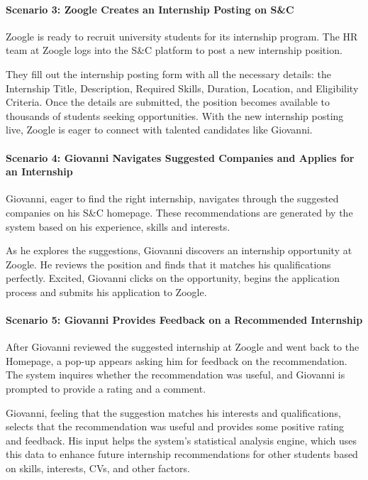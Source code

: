 \paragraph{Scenario 3: Zoogle Creates an Internship Posting on S\&C}

Zoogle is ready to recruit university students for its internship
program. The HR team at Zoogle logs into the S\&C platform to post a new
internship position.

They fill out the internship posting form with all the necessary
details: the Internship Title, Description, Required Skills, Duration,
Location, and Eligibility Criteria. Once the details are submitted, the
position becomes available to thousands of students seeking
opportunities. With the new internship posting live, Zoogle is eager to connect with
talented candidates like Giovanni.


\paragraph{Scenario 4: Giovanni Navigates Suggested Companies and Applies for an Internship}

Giovanni, eager to find the right internship, navigates through the
suggested companies on his S\&C homepage. These recommendations are
generated by the system based on his experience, skills and interests.

As he explores the suggestions, Giovanni discovers an internship
opportunity at Zoogle. He reviews the position and finds that it matches
his qualifications perfectly. Excited, Giovanni clicks on the
opportunity, begins the application process and submits his application
to Zoogle.


\paragraph{Scenario 5: Giovanni Provides Feedback on a Recommended
Internship}

After Giovanni reviewed the suggested internship at Zoogle and went back
to the Homepage, a pop-up appears asking him for feedback on the
recommendation. The system inquires whether the recommendation was
useful, and Giovanni is prompted to provide a rating and a comment.

Giovanni, feeling that the suggestion matches his interests and
qualifications, selects that the recommendation was useful and provides
some positive rating and feedback. His input helps the
system's statistical analysis engine, which uses this
data to enhance future internship recommendations for other students
based on skills, interests, CVs, and other factors.


